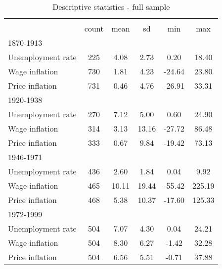 \begin{table}[htbp]\centering
\def\sym#1{\ifmmode^{#1}\else\(^{#1}\)\fi}
\caption{Descriptive statistics - full sample \label{T:Descriptives-Full}}
\begin{tabular}{l*{1}{ccccc}}
\hline\hline
                    &\multicolumn{5}{c}{}                                            \\
                    &       count&        mean&          sd&         min&         max\\
\hline
1870-1913           &            &            &            &            &            \\
Unemployment rate   &         225&        4.08&        2.73&        0.20&       18.40\\
Wage inflation      &         730&        1.81&        4.23&      -24.64&       23.80\\
Price inflation     &         731&        0.46&        4.76&      -26.91&       33.31\\
\hline
1920-1938           &            &            &            &            &            \\
Unemployment rate   &         270&        7.12&        5.00&        0.60&       24.90\\
Wage inflation      &         314&        3.13&       13.16&      -27.72&       86.48\\
Price inflation     &         333&        0.67&        9.84&      -19.42&       73.13\\
\hline
1946-1971           &            &            &            &            &            \\
Unemployment rate   &         436&        2.60&        1.84&        0.04&        9.92\\
Wage inflation      &         465&       10.11&       19.44&      -55.42&      225.19\\
Price inflation     &         468&        5.38&       10.37&      -17.60&      125.33\\
\hline
1972-1999           &            &            &            &            &            \\
Unemployment rate   &         504&        7.07&        4.30&        0.04&       24.21\\
Wage inflation      &         504&        8.30&        6.27&       -1.42&       32.28\\
Price inflation     &         504&        6.56&        5.51&       -0.71&       37.88\\

\end{tabular}
\end{table}
